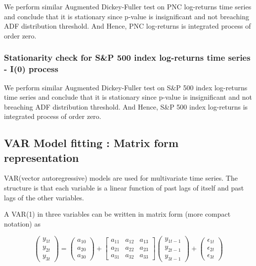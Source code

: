 \documentclass[a4paper, 11pt]{article}
\begin{document}


We perform similar Augmented Dickey-Fuller test on PNC log-returns time series and conclude that it is stationary since p-value is insignificant and not breaching ADF distribution threshold. And Hence, PNC log-returns is integrated process of order zero.

\subsubsection{Stationarity check for S\&P 500 index log-returns time series - I(0) process}



We perform similar Augmented Dickey-Fuller test on S\&P 500 index log-returns time series and conclude that it is stationary since p-value is insignificant and not breaching ADF distribution threshold. And Hence, S\&P 500 index log-returns is integrated process of order zero.

\pagebreak
\subsection{VAR Model fitting : Matrix form representation}

VAR(vector autoregressive) models are used for multivariate time series. The structure is that each variable is a linear function of past lags of itself and past lags of the other variables.

A VAR(1) in three variables can be written in matrix form (more compact notation) as

$$\begin{pmatrix} {y}_{1t} \\ y_{2t} \\ y_{3t}\end{pmatrix} =   
\begin{pmatrix} a_{10} \\ a_{20} \\ a_{30} \end{pmatrix} + \begin{bmatrix} a_{11} & a_{12} & a_{13} \\ a_{21} & a_{22} & a_{23} \\ a_{31} & a_{32} & a_{33}\end{bmatrix}\begin{pmatrix} y_{1t-1} \\ y_{2t-1}  \\ y_{3t-1}\end{pmatrix} + 
\begin{pmatrix} \epsilon_{1t} \\ \epsilon_{2t} \\ \epsilon_{3t}
\end{pmatrix}$$
\end{document}

